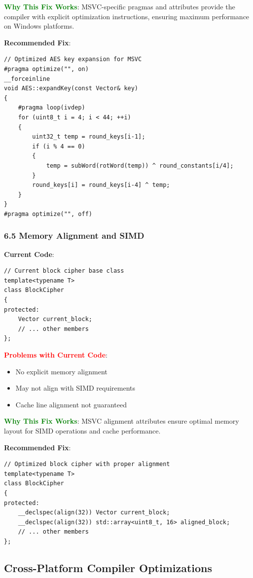 \documentclass[11pt,a4paper]{article}
\begin{document}
\textcolor{green}{\textbf{Why This Fix Works}}: MSVC-specific pragmas and attributes provide the compiler with explicit optimization instructions, ensuring maximum performance on Windows platforms.

\textbf{Recommended Fix}:
\begin{lstlisting}
// Optimized AES key expansion for MSVC
#pragma optimize("", on)
__forceinline
void AES::expandKey(const Vector& key)
{
    #pragma loop(ivdep)
    for (uint8_t i = 4; i < 44; ++i)
    {
        uint32_t temp = round_keys[i-1];
        if (i % 4 == 0)
        {
            temp = subWord(rotWord(temp)) ^ round_constants[i/4];
        }
        round_keys[i] = round_keys[i-4] ^ temp;
    }
}
#pragma optimize("", off)
\end{lstlisting}

\subsubsection{6.5 Memory Alignment and SIMD}

\textbf{Current Code}:
\begin{lstlisting}
// Current block cipher base class
template<typename T>
class BlockCipher
{
protected:
    Vector current_block;
    // ... other members
};
\end{lstlisting}

\textcolor{red}{\textbf{Problems with Current Code}}:
\begin{itemize}
    \item No explicit memory alignment
    \item May not align with SIMD requirements
    \item Cache line alignment not guaranteed
\end{itemize}

\textcolor{green}{\textbf{Why This Fix Works}}: MSVC alignment attributes ensure optimal memory layout for SIMD operations and cache performance.

\textbf{Recommended Fix}:
\begin{lstlisting}
// Optimized block cipher with proper alignment
template<typename T>
class BlockCipher
{
protected:
    __declspec(align(32)) Vector current_block;
    __declspec(align(32)) std::array<uint8_t, 16> aligned_block;
    // ... other members
};
\end{lstlisting}

\subsection{Cross-Platform Compiler Optimizations}
\end{document}
